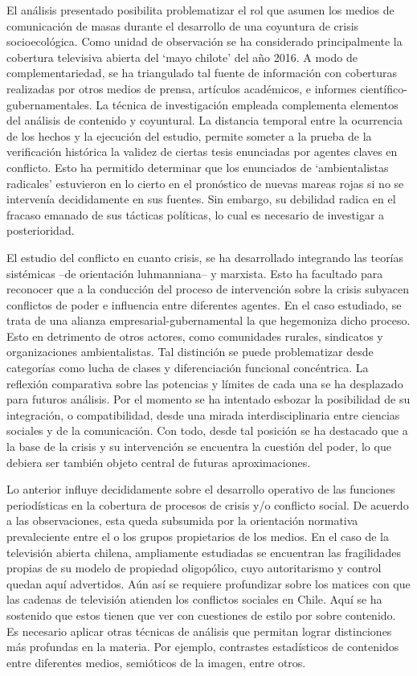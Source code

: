 \documentclass{textolivre}
\begin{document}
El análisis presentado posibilita problematizar el rol que asumen los medios de
comunicación de masas durante el desarrollo de una coyuntura de crisis socioecológica.
Como unidad de observación se ha considerado principalmente la cobertura televisiva
abierta del ‘mayo chilote’ del año 2016. A modo de complementariedad, se ha triangulado
tal fuente de información con coberturas realizadas por otros medios de prensa, artículos
académicos, e informes científico-gubernamentales. La técnica de investigación empleada
complementa elementos del análisis de contenido y coyuntural. La distancia temporal
entre la ocurrencia de los hechos y la ejecución del estudio, permite someter a la prueba
de la verificación histórica la validez de ciertas tesis enunciadas por agentes claves en
conflicto. Esto ha permitido determinar que los enunciados de ‘ambientalistas radicales’
estuvieron en lo cierto en el pronóstico de nuevas mareas rojas si no se intervenía
decididamente en sus fuentes. Sin embargo, su debilidad radica en el fracaso emanado
de sus tácticas políticas, lo cual es necesario de investigar a posterioridad.

El estudio del conflicto en cuanto crisis, se ha desarrollado integrando las teorías
sistémicas --de orientación luhmanniana-- y marxista. Esto ha facultado para reconocer
que a la conducción del proceso de intervención sobre la crisis subyacen conflictos de
poder e influencia entre diferentes agentes. En el caso estudiado, se trata de una alianza
empresarial-gubernamental la que hegemoniza dicho proceso. Esto en detrimento de
otros actores, como comunidades rurales, sindicatos y organizaciones ambientalistas. Tal
distinción se puede problematizar desde categorías como lucha de clases y diferenciación
funcional concéntrica. La reflexión comparativa sobre las potencias y límites de cada una
se ha desplazado para futuros análisis. Por el momento se ha intentado esbozar la
posibilidad de su integración, o compatibilidad, desde una mirada interdisciplinaria entre
ciencias sociales y de la comunicación. Con todo, desde tal posición se ha destacado que
a la base de la crisis y su intervención se encuentra la cuestión del poder, lo que debiera
ser también objeto central de futuras aproximaciones.

Lo anterior influye decididamente sobre el desarrollo operativo de las funciones
periodísticas en la cobertura de procesos de crisis y/o conflicto social. De acuerdo a las
observaciones, esta queda subsumida por la orientación normativa prevaleciente entre el
o los grupos propietarios de los medios. En el caso de la televisión abierta chilena,
ampliamente estudiadas se encuentran las fragilidades propias de su modelo de
propiedad oligopólico, cuyo autoritarismo y control quedan aquí advertidos. Aún así se
requiere profundizar sobre los matices con que las cadenas de televisión atienden los
conflictos sociales en Chile. Aquí se ha sostenido que estos tienen que ver con cuestiones
de estilo por sobre contenido. Es necesario aplicar otras técnicas de análisis que permitan
lograr distinciones más profundas en la materia. Por ejemplo, contrastes estadísticos de
contenidos entre diferentes medios, semióticos de la imagen, entre otros.
\end{document}
